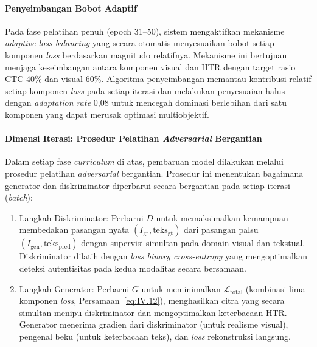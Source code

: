 \documentclass[12pt,a4paper]{article}
\begin{document}
\paragraph{Penyeimbangan Bobot Adaptif}

Pada fase pelatihan penuh (epoch 31--50), sistem mengaktifkan mekanisme \textit{adaptive loss balancing} yang secara otomatis menyesuaikan bobot setiap komponen \textit{loss} berdasarkan magnitudo relatifnya. Mekanisme ini bertujuan menjaga keseimbangan antara komponen visual dan HTR dengan target rasio CTC 40\% dan visual 60\%. Algoritma penyeimbangan memantau kontribusi relatif setiap komponen \textit{loss} pada setiap iterasi dan melakukan penyesuaian halus dengan \textit{adaptation rate} 0,08 untuk mencegah dominasi berlebihan dari satu komponen yang dapat merusak optimasi multiobjektif.

\paragraph{Dimensi Iterasi: Prosedur Pelatihan \textit{Adversarial} Bergantian}


Dalam setiap fase \textit{curriculum} di atas, pembaruan model dilakukan melalui prosedur pelatihan \textit{adversarial} bergantian. Prosedur ini menentukan bagaimana generator dan diskriminator diperbarui secara bergantian pada setiap iterasi (\textit{batch}):

\begin{enumerate}[label=\alph*., leftmargin=1.5em, labelsep=0.5em, itemindent=0pt, noitemsep, topsep=0pt]
  \item Langkah Diskriminator: Perbarui $D$ untuk memaksimalkan kemampuan membedakan pasangan nyata $(I_{\text{gt}}, \text{teks}_{\text{gt}})$ dari pasangan palsu $(I_{\text{gen}}, \text{teks}_{\text{pred}})$ dengan supervisi simultan pada domain visual dan tekstual. Diskriminator dilatih dengan \textit{loss binary cross-entropy} yang mengoptimalkan deteksi autentisitas pada kedua modalitas secara bersamaan.

  \item Langkah Generator: Perbarui $G$ untuk meminimalkan $\mathcal{L}_{\text{total}}$ (kombinasi lima komponen \textit{loss}, Persamaan~\ref{eq:IV.12}), menghasilkan citra yang secara simultan menipu diskriminator dan mengoptimalkan keterbacaan HTR. Generator menerima gradien dari diskriminator (untuk realisme visual), pengenal beku (untuk keterbacaan teks), dan \textit{loss} rekonstruksi langsung.
\end{enumerate}
\end{document}
